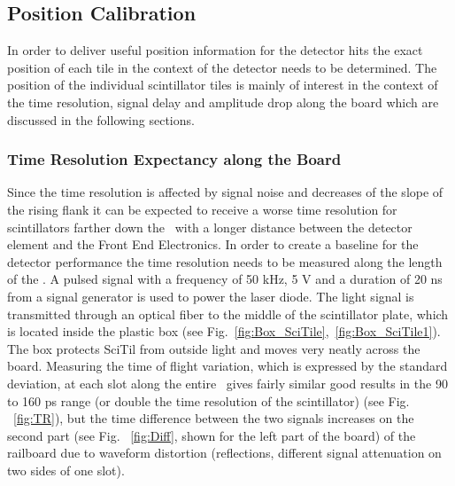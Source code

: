 \documentclass[../BTOF_summary.tex]{subfiles}
\begin{document}
\subsection{Position Calibration}

In order to deliver useful position information for the detector hits the exact position of each tile in the context of the detector needs to be determined.
The position of the individual scintillator tiles is mainly of interest in the context of the time resolution, signal delay and amplitude drop along the board which are discussed in the following sections.

\subsubsection{Time Resolution Expectancy along the Board}

Since the time resolution is affected by signal noise and decreases of the slope of the rising flank it can be expected to receive a worse time resolution for scintillators farther down the \railboard\ with a longer distance between the detector element and the Front End Electronics.
In order to create a baseline for the detector performance the time resolution needs to be measured along the length of the \railboard .
A pulsed signal with a frequency of 50 kHz, 5 V and a duration of 20 ns from a signal generator is used to power the laser diode. The light signal is transmitted through an optical fiber to the middle of the scintillator plate, which is located inside the plastic box (see Fig.~\ref{fig:Box_SciTile},~\ref{fig:Box_SciTile1}). The box protects SciTil from outside light and moves very neatly across the board.
Measuring the time of flight variation, which is expressed by the standard deviation, at each slot along the entire \railboard\ gives fairly similar good results in the 90 to 160 ps range (or double the time resolution of the scintillator) (see Fig. ~\ref{fig:TR}), but the time difference between the two signals increases on the second part (see Fig. ~\ref{fig:Diff}, shown for the left part of the board) of the railboard due to waveform distortion (reflections, different signal attenuation on two sides of one slot).
\end{document}
